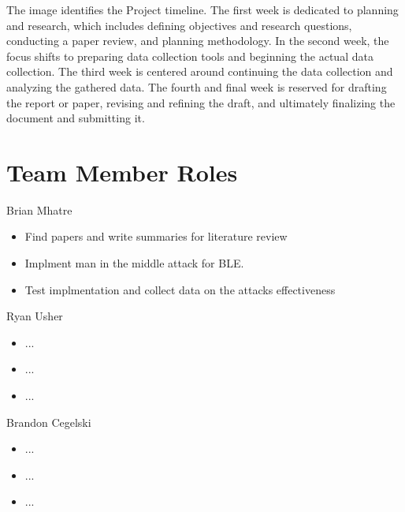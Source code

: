 \documentclass{article}
\begin{document}
    The image identifies the Project timeline. The first week is dedicated to planning and research, which includes defining objectives and research questions, conducting a paper review, and planning methodology. In the second week, the focus shifts to preparing data collection tools and beginning the actual data collection. The third week is centered around continuing the data collection and analyzing the gathered data. The fourth and final week is reserved for drafting the report or paper, revising and refining the draft, and ultimately finalizing the document and submitting it.
\section{Team Member Roles}
Brian Mhatre 
\begin{itemize}
    \item Find papers and write summaries for literature review
    \item Implment man in the middle attack for BLE.
    \item Test implmentation and collect data on the attacks effectiveness
\end{itemize}
Ryan Usher
\begin{itemize}
    \item ...
    \item ...
    \item ...
\end{itemize}

Brandon Cegelski 
\begin{itemize}
    \item ...
    \item ...
    \item ...
\end{itemize}
\end{document}
